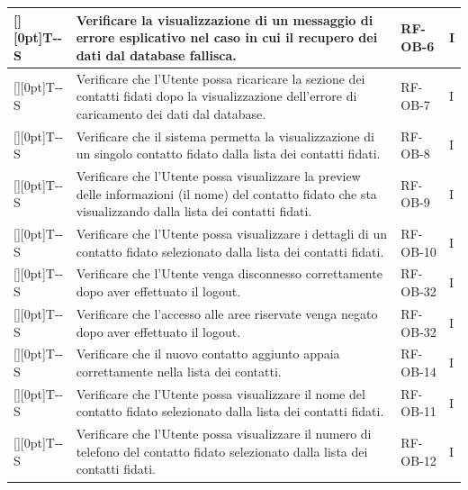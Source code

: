 \documentclass[a4paper,12pt]{article}
\newcounter{testsys}
\newcommand{\systestcode}{%
  \raisebox{0pt}[\height][0pt]{\hypertarget{T-\arabic{testsys}-S}{}}T-\arabic{testsys}-S%
}
\begin{document}
\begin{longtable}{| >{\centering\arraybackslash}p{} | >{\raggedright\arraybackslash}p{} | >{\centering\arraybackslash}p{} | >{\centering\arraybackslash}p{} |}
\stepcounter{testsys} \systestcode & Verificare la visualizzazione di un messaggio di errore esplicativo nel caso in cui il recupero dei dati dal database fallisca. & RF-OB-6 & I \\
\hline

\stepcounter{testsys} \systestcode & Verificare che l'Utente possa ricaricare la sezione dei contatti fidati dopo la visualizzazione dell'errore di caricamento dei dati dal database. & RF-OB-7 & I \\
\hline

\stepcounter{testsys} \systestcode & Verificare che il sistema permetta la visualizzazione di un singolo contatto fidato dalla lista dei contatti fidati. & RF-OB-8 & I \\
\hline

\stepcounter{testsys} \systestcode & Verificare che l'Utente possa visualizzare la preview delle informazioni (il nome) del contatto fidato che sta visualizzando dalla lista dei contatti fidati. & RF-OB-9 & I \\
\hline

\stepcounter{testsys} \systestcode & Verificare che l'Utente possa visualizzare i dettagli di un contatto fidato selezionato dalla lista dei contatti fidati. & RF-OB-10 & I \\
\hline

\stepcounter{testsys} \systestcode & Verificare che l'Utente venga disconnesso correttamente dopo aver effettuato il logout. & RF-OB-32 & I \\
\hline

\stepcounter{testsys} \systestcode & Verificare che l'accesso alle aree riservate venga negato dopo aver effettuato il logout. & RF-OB-32 & I \\
\hline

\stepcounter{testsys} \systestcode & Verificare che il nuovo contatto aggiunto appaia correttamente nella lista dei contatti. & RF-OB-14 & I \\
\hline

\stepcounter{testsys} \systestcode & Verificare che l'Utente possa visualizzare il nome del contatto fidato selezionato dalla lista dei contatti fidati. & RF-OB-11 & I \\
\hline

\stepcounter{testsys} \systestcode & Verificare che l'Utente possa visualizzare il numero di telefono del contatto fidato selezionato dalla lista dei contatti fidati. & RF-OB-12 & I \\
\hline


\end{longtable}
\end{document}
